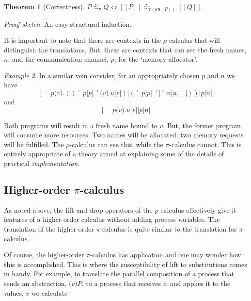 \documentclass[]{amsart}
\newcommand{\ldb}{[\![}
\newcommand{\rdb}{]\!]}
\newcommand{\lpquote}{\ulcorner}
\newcommand{\rpquote}{\urcorner}
\newcommand{\newkw}{\nu}
\newcommand{\id}[1]{\texttt{#1}}
\newcommand{\juxtap}{\mathbin{\id{|}}}
\newcommand{\concat}{\mathbin{\id{.}}}
\newcommand{\binpar}[2]{#1 \juxtap #2}
\newcommand{\outputp}[2]{#1 \id{[} #2 \id{]}}
\newcommand{\prefix}[3]{#1 \id{(} #2 \id{)} \concat #3}
\newcommand{\quotep}[1]{\lpquote #1 \rpquote}
\newcommand{\newp}[2]{\id{(}\newkw \; #1 \id{)} #2}
\newcommand{\absp}[2]{\id{(} #1 \id{)} #2}
\newcommand{\meaningof}[1]{\ldb #1 \rdb}
\newcommand{\wbbisim}{\stackrel{\centerdot}{\approx}} %
\newtheorem{thm}{Theorem}[subsection]
\theoremstyle{definition}
\theoremstyle{remark}
\newtheorem{example}[thm]{Example}
\numberwithin{equation}{subsection}
\newcommand{\pic}{$\pi$-calculus}
\newcommand{\rhoc}{$\rho$-calculus}
\begin{document}
\begin{thm}[Correctness]	
	$P \wbbisim_{\pi} Q \iff \ldb P \rdb \wbbisim_{r(\texttt{FN}(P))} \ldb Q \rdb$.
\end{thm}

\emph{Proof sketch}: An easy structural induction.

It is important to note that there are contexts in the {\rhoc} that
will distinguish the translations. But, these are contexts that can
see the fresh names, $n$, and the communication channel, $p$, for the `memory
allocator'.

\begin{example}
	In a similar vein consider, for an appropriately chosen $p$ and $n$ we have
	\begin{equation*}
		\meaningof{\newp{v}{\newp{v}{\outputp{u}{v}}}} = 
			\binpar{\prefix{p}{v}{(\binpar{(\prefix{\quotep{\outputp{p}{p}}}{v}{\outputp{u}{v}})}
					              {(\outputp{\quotep{\outputp{p}{p}}}{\quotep{\outputp{n}{n}}})})}}
			       {\outputp{p}{n}}
	\end{equation*}
	and
	\begin{equation*}
		\meaningof{\newp{v}{\outputp{u}{v}}} = 
				\binpar	{\prefix{p}{v}{\outputp{u}{v}}}
			       		{\outputp{p}{n}}
	\end{equation*}

	Both programs will result in a fresh name bound to $v$. But,
	the former program will consume more resources. Two names will
	be allocated; two memory requests will be fulfilled. The
	{\rhoc} can see this, while the {\pic} cannot. This is
	entirely appropriate of a theory aimed at explaining some of
	the details of practical \emph{implementation}.
\end{example}

\subsection{Higher-order {\pic}}

As noted above, the lift and drop operators of the {\rhoc} effectively
give it features of a higher-order calculus without adding process
variables. The translation of the higher-order {\pic} is quite similar
to the translation for {\pic}. 

Of course, the higher-order {\pic} has application and one may wonder
how this is accomplished. This is where the susceptibility of lift to
substitutions comes in handy. For example, to translate the parallel
composition of a process that sends an abstraction, $\absp{v}{P}$, to a
process that receives it and applies it to the values, $v$ we calculate
\end{document}

